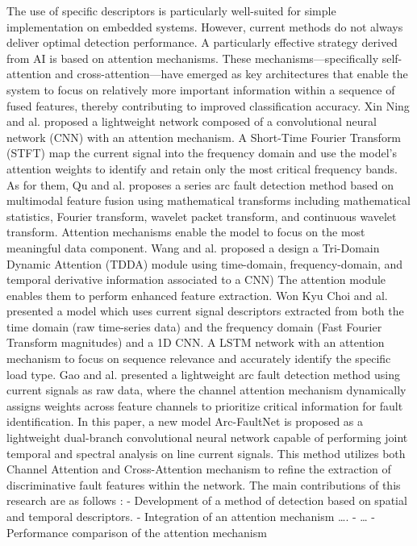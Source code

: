 \documentclass[journal,article,submit,moreauthors]{Definitions/mdpi}
\begin{document}
The use of specific descriptors is particularly well-suited for simple implementation on
embedded systems. However, current methods do not always deliver optimal detection
performance. A particularly effective strategy derived from AI is based on attention
mechanisms. These mechanisms—specifically self-attention and cross-attention—have
emerged as key architectures that enable the system to focus on relatively more important
information within a sequence of fused features, thereby contributing to improved
classification accuracy.
Xin Ning and al. proposed a lightweight network composed of a convolutional neural network
(CNN) with an attention mechanism. A Short-Time Fourier Transform (STFT) map the
current signal into the frequency domain and use the model’s attention weights to identify and
retain only the most critical frequency bands.
As for them, Qu and al. proposes a series arc fault detection method based on multimodal
feature fusion using mathematical transforms including mathematical statistics, Fourier
transform, wavelet packet transform, and continuous wavelet transform. Attention
mechanisms enable the model to focus on the most meaningful data component.
Wang and al. proposed a design a Tri-Domain Dynamic Attention (TDDA) module using
time-domain, frequency-domain, and temporal derivative information associated to a CNN)
The attention module enables them to perform enhanced feature extraction.
Won Kyu Choi and al. presented a model which uses current signal descriptors extracted from
both the time domain (raw time-series data) and the frequency domain (Fast Fourier
Transform magnitudes) and a 1D CNN. A LSTM network with an attention mechanism to
focus on sequence relevance and accurately identify the specific load type.
Gao and al. presented a lightweight arc fault detection method using current signals as raw
data, where the channel attention mechanism dynamically assigns weights across feature
channels to prioritize critical information for fault identification.
In this paper, a new model Arc-FaultNet is proposed as a lightweight dual-branch
convolutional neural network capable of performing joint temporal and spectral analysis on
line current signals. This method utilizes both Channel Attention and Cross-Attention
mechanism to refine the extraction of discriminative fault features within the network.
The main contributions of this research are as follows :
- Development of a method of detection based on spatial and temporal descriptors.
- Integration of an attention mechanism ….
- …
- Performance comparison of the attention mechanism 
\end{document}
